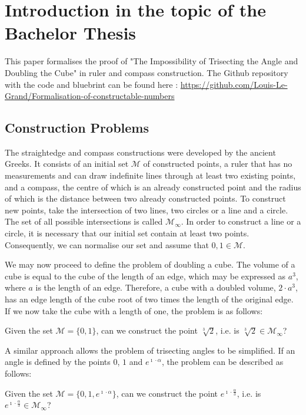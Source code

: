 \chapter[Introduction]{Introduction in the topic of the Bachelor Thesis}

This paper formalises the proof of "The Impossibility of Trisecting the Angle and Doubling the Cube" in ruler and compass construction. 
The Github repository with the code and bluebrint can be found here : \url{https://github.com/Louis-Le-Grand/Formalisation-of-constructable-numbers}
\section{Construction Problems}
The straightedge and compass constructions were developed by the ancient Greeks. 
It consists of an initial set $\mathcal{M}$ of constructed points, a ruler that has no measurements and can draw indefinite lines through at least two existing points,
and a compass, the centre of which is an already constructed point and the radius of which is the distance between two already constructed points. 
To construct new points, take the intersection of two lines, two circles or a line and a circle. The set of all possible intersections is called $\mathcal{M}_{\infty}$. 
In order to construct a line or a circle, it is necessary that our initial set contain at least two points. Consequently, we can normalise our set and assume that $0, 1 \in \mathcal{M}$.

We may now proceed to define the problem of doubling a cube. 
The volume of a cube is equal to the cube of the length of an edge, which may be expressed as $a^3$, where $a$ is the length of an edge. 
Therefore, a cube with a doubled volume, $2\cdot a^3$, has an edge length of the cube root of two times the length of the original edge. 
If we now take the cube with a length of one, the problem is as follows:
\begin{problem}
    Given the set $\mathcal{M} = \{0, 1\}$, can we construct the point $\sqrt[3]{2}$, i.e. is $\sqrt[3]{2} \in \mathcal{M}_{\infty}$?
\end{problem}

A similar approach allows the problem of trisecting angles to be simplified. 
If an angle is defined by the points $0$, $1$ and $e^{\imath\cdot\alpha}$, the problem can be described as follows:

\begin{problem}
    Given the set $\mathcal{M} = \{0, 1, e^{\imath\cdot\alpha}\}$, can we construct the point $e^{\imath\cdot\frac{\alpha}{3}}$, i.e. is $e^{\imath\cdot\frac{\alpha}{3}} \in \mathcal{M}_{\infty}$?
\end{problem}

